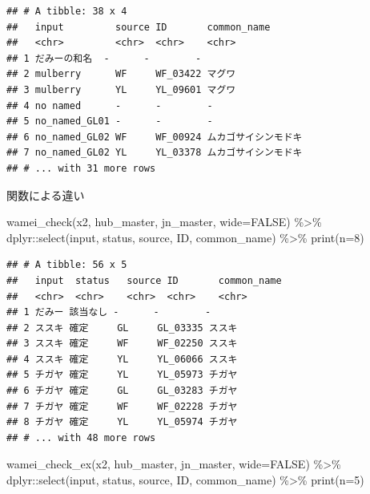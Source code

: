 \documentclass[
  a5paper,
  landscape,
  notitlepage]{report}
\newenvironment{Shaded}{\begin{snugshade}}{\end{snugshade}}
\newcommand{\AttributeTok}[1]{\textcolor[rgb]{0.77,0.63,0.00}{#1}}
\newcommand{\ConstantTok}[1]{\textcolor[rgb]{0.00,0.00,0.00}{#1}}
\newcommand{\DecValTok}[1]{\textcolor[rgb]{0.00,0.00,0.81}{#1}}
\newcommand{\FunctionTok}[1]{\textcolor[rgb]{0.00,0.00,0.00}{#1}}
\newcommand{\NormalTok}[1]{#1}
\newcommand{\SpecialCharTok}[1]{\textcolor[rgb]{0.00,0.00,0.00}{#1}}
\begin{document}
\begin{verbatim}
## # A tibble: 38 x 4
##   input         source ID       common_name         
##   <chr>         <chr>  <chr>    <chr>               
## 1 だみーの和名  -      -        -                   
## 2 mulberry      WF     WF_03422 マグワ              
## 3 mulberry      YL     YL_09601 マグワ              
## 4 no named      -      -        -                   
## 5 no_named_GL01 -      -        -                   
## 6 no_named_GL02 WF     WF_00924 ムカゴサイシンモドキ
## 7 no_named_GL02 YL     YL_03378 ムカゴサイシンモドキ
## # ... with 31 more rows
\end{verbatim}

\newpage

\fontsize{32pt}{32pt}\selectfont

\begin{center}
関数による違い
\end{center}

\fontsize{12pt}{12pt}\selectfont

\begin{Shaded}
\begin{Highlighting}[]
\FunctionTok{wamei\_check}\NormalTok{(x2, hub\_master, jn\_master, }\AttributeTok{wide=}\ConstantTok{FALSE}\NormalTok{) }\SpecialCharTok{\%\textgreater{}\%}
\NormalTok{  dplyr}\SpecialCharTok{::}\FunctionTok{select}\NormalTok{(input, status, source, ID, common\_name) }\SpecialCharTok{\%\textgreater{}\%} \FunctionTok{print}\NormalTok{(}\AttributeTok{n=}\DecValTok{8}\NormalTok{)}
\end{Highlighting}
\end{Shaded}

\begin{verbatim}
## # A tibble: 56 x 5
##   input  status   source ID       common_name
##   <chr>  <chr>    <chr>  <chr>    <chr>      
## 1 だみー 該当なし -      -        -          
## 2 ススキ 確定     GL     GL_03335 ススキ     
## 3 ススキ 確定     WF     WF_02250 ススキ     
## 4 ススキ 確定     YL     YL_06066 ススキ     
## 5 チガヤ 確定     YL     YL_05973 チガヤ     
## 6 チガヤ 確定     GL     GL_03283 チガヤ     
## 7 チガヤ 確定     WF     WF_02228 チガヤ     
## 8 チガヤ 確定     YL     YL_05974 チガヤ     
## # ... with 48 more rows
\end{verbatim}

\begin{Shaded}
\begin{Highlighting}[]
\FunctionTok{wamei\_check\_ex}\NormalTok{(x2, hub\_master, jn\_master, }\AttributeTok{wide=}\ConstantTok{FALSE}\NormalTok{) }\SpecialCharTok{\%\textgreater{}\%} 
\NormalTok{  dplyr}\SpecialCharTok{::}\FunctionTok{select}\NormalTok{(input, status, source, ID, common\_name) }\SpecialCharTok{\%\textgreater{}\%} \FunctionTok{print}\NormalTok{(}\AttributeTok{n=}\DecValTok{5}\NormalTok{)}
\end{Highlighting}
\end{Shaded}
\end{document}
